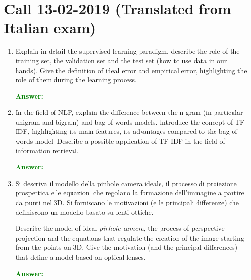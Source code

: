 \documentclass[12pt]{article}
\begin{document}
\section{Call 13-02-2019 (Translated from Italian exam)}
\begin{enumerate}[label=\textbf{D.\arabic*}]
    \item Explain in detail the supervised learning paradigm, describe the role of the training set, the validation set and the test set (how to use data in our hands).
    Give the definition of ideal error and empirical error, highlighting the role of them during the learning process.

    \textcolor{green}{\textbf{Answer:}}

    \item In the field of NLP, explain the difference between the n-gram (in particular unigram and bigram) and bag-of-words models.
    Introduce the concept of TF-IDF, highlighting its main features, its advantages compared to the bag-of-words model.
    Describe a possible application of TF-IDF in the field of information retrieval.

    \textcolor{green}{\textbf{Answer:}}

    \item Si descriva il modello della pinhole camera ideale, il processo di proiezione prospettica e le equazioni che regolano la formazione dell'immagine a partire da punti nel 3D.
    Si forniscano le motivazioni (e le principali differenze) che definiscono un modello basato su lenti ottiche.

    Describe the model of ideal \textit{pinhole camera}, the process of perspective projection and the equations that regulate the creation of the image starting from the points on 3D.
    Give the motivation (and the principal differences) that define a model based on optical lenses.

    \textcolor{green}{\textbf{Answer:}}



\end{enumerate}
\end{document}

